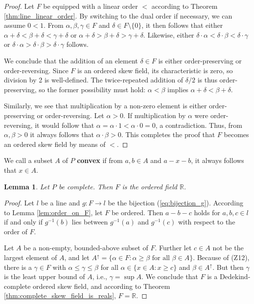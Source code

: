 \documentclass[11pt,a4paper]{article}
\newcommand{\betw}[3]{#1 - #2 - #3}
\newtheorem{lemma}[theorem]{Lemma}
\begin{document}
\begin{proof}
Let $F$ be equipped with a linear order $<$ according to Theorem \ref{thm:line_linear_order}. By switching to the dual order if necessary, we can assume $0 < 1$. From $\alpha, \beta, \gamma \in F$ and $\delta \in F \setminus \{0\}$, it then follows that either $\alpha + \delta < \beta + \delta < \gamma + \delta$ or $\alpha + \delta > \beta + \delta > \gamma + \delta$. Likewise, either $\delta \cdot \alpha < \delta \cdot \beta < \delta \cdot \gamma$ or $\delta \cdot \alpha > \delta \cdot \beta > \delta \cdot \gamma$ follows.

We conclude that the addition of an element $\delta \in F$ is either order-preserving or order-reversing. Since $F$ is an ordered skew field, its characteristic is zero, so division by 2 is well-defined. The twice-repeated addition of $\delta/2$ is thus order-preserving, so the former possibility must hold: $\alpha < \beta$ implies $\alpha + \delta < \beta + \delta$.

Similarly, we see that multiplication by a non-zero element is either order-preserving or order-reversing. Let $\alpha > 0$. If multiplication by $\alpha$ were order-reversing, it would follow that $\alpha = \alpha \cdot 1 < \alpha \cdot 0 = 0$, a contradiction. Thus, from $\alpha, \beta > 0$ it always follows that $\alpha \cdot \beta > 0$. This completes the proof that $F$ becomes an ordered skew field by means of $<$.
\end{proof}

We call a subset $A$ of $P$ \textbf{convex} if from $a, b \in A$ and $\betw{a}{x}{b}$, it always follows that $x \in A$.

\begin{lemma} \label{lem:F_is_R}
Let $P$ be complete. Then $F$ is the ordered field $\mathbb{R}$.
\end{lemma}

\begin{proof}
Let $l$ be a line and $g: F \to l$ be the bijection (\ref{eq:bijection_g}). According to Lemma \ref{lem:order_on_F}, let $F$ be ordered. Then $\betw{a}{b}{c}$ holds for $a, b, c \in l$ if and only if $g^{-1}(b)$ lies between $g^{-1}(a)$ and $g^{-1}(c)$ with respect to the order of $F$.

Let $A$ be a non-empty, bounded-above subset of $F$. Further let $c \in A$ not be the largest element of $A$, and let $A^\uparrow = \{\alpha \in F : \alpha \ge \beta \text{ for all } \beta \in A\}$. Because of (Z12), there is a $\gamma \in F$ with $\alpha \le \gamma \le \beta$ for all $\alpha \in \{x \in A : x \ge c\}$ and $\beta \in A^\uparrow$. But then $\gamma$ is the least upper bound of $A$, i.e., $\gamma = \sup A$. We conclude that $F$ is a Dedekind-complete ordered skew field, and according to Theorem \ref{thm:complete_skew_field_is_reals}, $F = \mathbb{R}$.
\end{proof}
\end{document}
